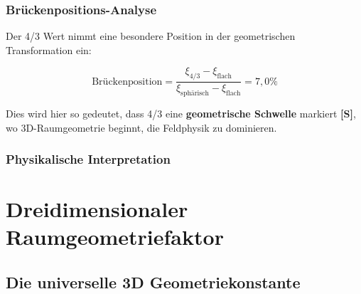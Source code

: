 	\subsubsection{Brückenpositions-Analyse}
	\label{subsubsec:brueckenposition}
	
	Der 4/3 Wert nimmt eine besondere Position in der geometrischen Transformation ein:
	
	\begin{equation}
		\text{Brückenposition} = \frac{\xi_{4/3} - \xi_{\text{flach}}}{\xi_{\text{sphärisch}} - \xi_{\text{flach}}} = 7{,}0\%
		\label{eq:brueckenposition}
	\end{equation}
	
	Dies wird hier so gedeutet, dass 4/3 eine \textbf{geometrische Schwelle} markiert \textbf{[S]}, wo 3D-Raumgeometrie beginnt, die Feldphysik zu dominieren.
	
	\subsubsection{Physikalische Interpretation}
	\label{subsubsec:physikalische_interpretation}
	
	\begin{table}[htbp]
		\centering
		\caption{Physikalische Regime in der $\xi$ Parameter Hierarchie}
		\label{tab:physikalische_regime}
	\end{table}
	
	\section{Dreidimensionaler Raumgeometriefaktor}
	\label{sec:3d_geometriefaktor}
	
	\subsection{Die universelle 3D Geometriekonstante}
	\label{subsec:universelle_3d_konstante}
	
